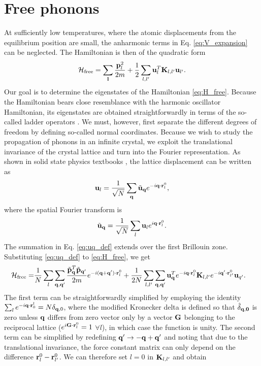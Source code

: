 \section{Free phonons}

At sufficiently low temperatures, where the atomic displacements from the equilibrium position are small, the anharmonic terms in Eq. \eqref{eq:V_expansion} can be neglected. The Hamiltonian is then of the quadratic form
\begin{equation}
 \mathcal{H}_{\textrm{free}} = \sum_{\mathbf{l}} \frac{\mathbf{p}_l^2}{2m} + \frac{1}{2} \sum_{l,l'} \mathbf{u}_l^T \mathbf{K}_{l,l'} \mathbf{u}_{l'}. \label{eq:H_free}
\end{equation}
Our goal is to determine the eigenstates of the Hamiltonian \eqref{eq:H_free}. Because the Hamiltonian bears close resemblance with the harmonic oscillator Hamiltonian, its eigenstates are obtained straightforwardly in terms of the so-called ladder operators \cite{schwabl}. We must, however, first separate the different degrees of freedom by defining so-called normal coordinates. Because we wish to study the propagation of phonons in an infinite crystal, we exploit the translational invariance of the crystal lattice and turn into the Fourier representation. As shown in solid state physics textbooks \cite{ashcroftmermin}, the lattice displacement can be written as 
\begin{equation}
 \mathbf{u}_l = \frac{1}{\sqrt{N}}  \sum_{\mathbf{q}} \tilde{\mathbf{u}}_{\mathbf{q}} e^{-i\mathbf{q} \cdot\mathbf{r}_l^0 }, \label{eq:uq_def}
\end{equation}
where the spatial Fourier transform is
\begin{equation}
 \tilde{\mathbf{u}}_{\mathbf{q}} = \frac{1}{\sqrt{N}} \sum_l \mathbf{u}_l e^{i\mathbf{q}\cdot \mathbf{r}_l^0}.
\end{equation}
The summation in Eq. \eqref{eq:uq_def} extends over the first Brillouin zone. Substituting \eqref{eq:uq_def} to \eqref{eq:H_free}, we get
\begin{alignat}{2}
 \mathcal{H}_{\textrm{free}} =& \frac{1}{N} \sum_{l} \sum_{\mathbf{q},\mathbf{q'}} \frac{\tilde{\mathbf{p}}_{\mathbf{q}}^T\tilde{\mathbf{p}}_{\mathbf{q'}}}{2m} e^{-i(\mathbf{q}+\mathbf{q}')\cdot\mathbf{r}^0_l} + \frac{1}{2N} \sum_{l,l'} \sum_{\mathbf{q},\mathbf{q}'} \mathbf{u}_{\mathbf{q}}^T e^{-i\mathbf{q}\cdot\mathbf{r}_l^0}\mathbf{K}_{l,l'}e^{-i\mathbf{q}'\cdot\mathbf{r}_{l'}^0} \mathbf{u}_{q'}. 
\end{alignat}
The first term can be straightforwardly simplified by employing the identity $\sum_{l}e^{-i\mathbf{q}\cdot \mathbf{r}_0^l} = N\delta_{\mathbf{q},0}$, where the modified Kronecker delta is defined so that $\hat \delta_{\mathbf{q},\mathbf{0}}$ is zero unless $\mathbf{q}$ differs from zero vector only by a vector $\mathbf{G}$ belonging to the reciprocal lattice ($e^{i\mathbf{G}\cdot \mathbf{r}_l^0}=1$ $\forall l$), in which case the function is unity. The second term can be simplified by redefining $\mathbf{q}' \to -\mathbf{q}+\mathbf{q}'$ and noting that due to the translational invariance, the force constant matrix can only depend on the difference $\mathbf{r}^0_l - \mathbf{r}^0_{l'}$. We can therefore set $l=0$ in $\mathbf{K}_{l,l'}$ and obtain 
